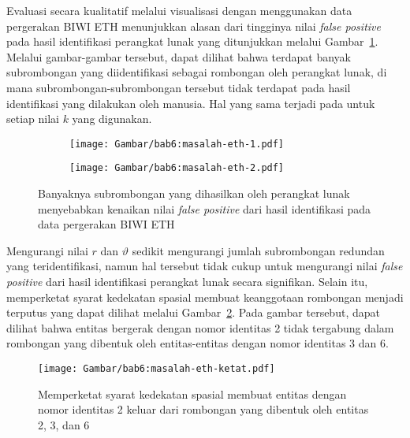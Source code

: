 Evaluasi secara kualitatif melalui visualisasi dengan menggunakan data pergerakan BIWI ETH menunjukkan alasan dari tingginya nilai \textit{false positive} pada hasil identifikasi perangkat lunak yang ditunjukkan melalui Gambar~\ref{bab6:masalah-eth}. Melalui gambar-gambar tersebut, dapat dilihat bahwa terdapat banyak subrombongan yang diidentifikasi sebagai rombongan oleh perangkat lunak, di mana subrombongan-subrombongan tersebut tidak terdapat pada hasil identifikasi yang dilakukan oleh manusia. Hal yang sama terjadi pada untuk setiap nilai $k$ yang digunakan.

\begin{figure}[h]
    \centering
    \captionsetup{width=.65\textwidth}
    \begin{subfigure}[t]{0.275\textwidth}
        \centering
        \texttt{[image: Gambar/bab6:masalah-eth-1.pdf]}
    \end{subfigure}
    \begin{subfigure}[t]{0.275\textwidth}
        \centering
        \texttt{[image: Gambar/bab6:masalah-eth-2.pdf]}
    \end{subfigure}
    \caption[Subrombongan pada data BIWI ETH]{Banyaknya subrombongan yang dihasilkan oleh perangkat lunak menyebabkan kenaikan nilai \textit{false positive} dari hasil identifikasi pada data pergerakan BIWI ETH}
    \label{bab6:masalah-eth}
\end{figure}

Mengurangi nilai $r$ dan $\vartheta$ sedikit mengurangi jumlah subrombongan redundan yang teridentifikasi, namun hal tersebut tidak cukup untuk mengurangi nilai \textit{false positive} dari hasil identifikasi perangkat lunak secara signifikan. Selain itu, memperketat syarat kedekatan spasial membuat keanggotaan rombongan menjadi terputus yang dapat dilihat melalui Gambar~\ref{bab6:masalah-syarat-ketat-eth}. Pada gambar tersebut, dapat dilihat bahwa entitas bergerak dengan nomor identitas 2 tidak tergabung dalam rombongan yang dibentuk oleh entitas-entitas dengan nomor identitas 3 dan 6.

\begin{figure}[t]
    \centering
    \captionsetup{width=0.6\textwidth}
    \texttt{[image: Gambar/bab6:masalah-eth-ketat.pdf]}
    \caption[Dampak ketatnya syarat kedekatan spasial pada data ETH]{Memperketat syarat kedekatan spasial membuat entitas dengan nomor identitas 2 keluar dari rombongan yang dibentuk oleh entitas 2, 3, dan 6}
    \label{bab6:masalah-syarat-ketat-eth}
\end{figure}

